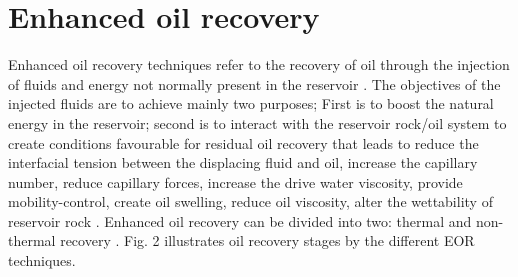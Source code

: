 \begin{description}[style=nextline]
\end{description}

\section{Enhanced oil recovery}
Enhanced oil recovery techniques refer to the recovery of oil through the injection of fluids and energy not 
normally present in the reservoir \citep{Romero}. The objectives of the 
injected fluids are to achieve mainly two purposes; First is to boost the 
natural energy in the reservoir; second is to interact with the reservoir 
rock/oil system to create conditions favourable for residual oil recovery that 
leads to reduce the interfacial tension between the displacing fluid and oil, 
increase the capillary number, reduce capillary forces, increase the drive water 
viscosity, provide mobility-control, create oil swelling, reduce oil viscosity, 
alter the wettability of reservoir rock \citep{Romero}. Enhanced oil 
recovery can be divided into two: thermal and non-thermal recovery \citep{Anazi}. Fig. 2 illustrates oil recovery stages by the different EOR 
techniques.
